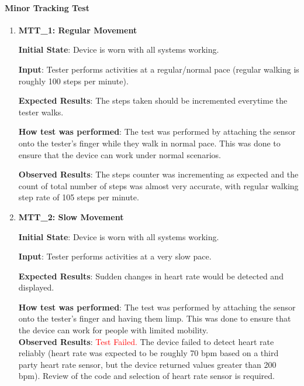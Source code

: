 \documentclass[12pt, titlepage]{article}
\begin{document}
\paragraph{Minor Tracking Test}
\begin{enumerate}
  \item{\textbf{MTT\_1: Regular Movement} \\}\label{MTT1}

  \textbf{Initial State}: Device is worn with all systems working.

  \textbf{Input}: Tester performs activities at a regular/normal pace (regular walking is roughly 100 steps per minute).

  \textbf{Expected Results}: The steps taken should be incremented everytime the tester walks.

  \textbf{How test was performed}: The test was performed by attaching the sensor onto the tester's finger while they walk in normal pace. This was done to ensure that the device can work under normal scenarios.

  \textbf{Observed Results}: The steps counter was incrementing as expected and the count of total number of steps was almost very accurate, with regular walking step rate of 105 steps per minute.

  \item{\textbf{MTT\_2: Slow Movement} \\}\label{MTT2}

  \textbf{Initial State}: Device is worn with all systems working.

  \textbf{Input}: Tester performs activities at a very slow pace.

  \textbf{Expected Results}: Sudden changes in heart rate would be detected and displayed.

  \textbf{How test was performed}: The test was performed by attaching the sensor onto the tester's finger and having them limp. This was done to ensure that the device can work for people with limited mobility.\\

  \textbf{Observed Results}: \textcolor{red}{Test Failed.} The device failed to detect heart rate reliably (heart rate was expected to be roughly 70 bpm based on a third party heart rate sensor, but the device returned values greater than 200 bpm). Review of the code and selection of heart rate sensor is required.

\end{enumerate}
\end{document}
